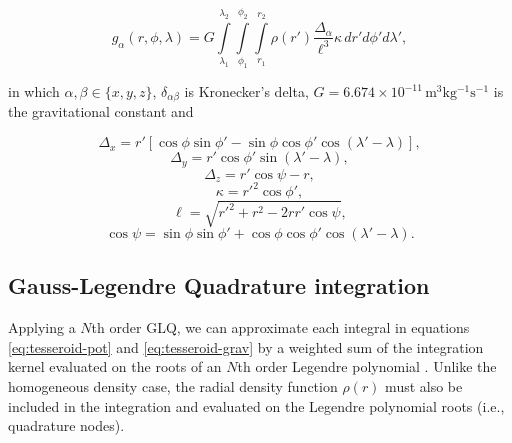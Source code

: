\documentclass[extra, referee]{gji}
\begin{document}
\begin{equation}
    g_{\alpha}(r,\phi,\lambda) = G
    \int\limits_{\lambda_1}^{\lambda_2}
    \int\limits_{\phi_1}^{\phi_2}
    \int\limits_{r_1}^{r_2}
    \rho(r') \frac{\Delta_\alpha}{\ell^3}
    \kappa \, dr' d\phi' d\lambda',
\label{eq:tesseroid-grav}
\end{equation}

\noindent in which $\alpha, \beta \in \{x, y, z\}$, $\delta_{\alpha\beta}$ is
Kronecker's delta, $G = 6.674\times10^{-11}\, \text{m$^3$kg$^{-1}$s$^{-1}$}$ is the
gravitational constant and

\begin{equation}
    \Delta_x = r'[\cos\phi\sin\phi' - \sin\phi\cos\phi'
               \cos(\lambda' - \lambda)],
\end{equation}
\begin{equation}
    \Delta_y = r' \cos \phi' \sin(\lambda' - \lambda),
\end{equation}
\begin{equation}
    \Delta_z = r' \cos \psi - r,
\end{equation}
\begin{equation}
    \kappa = {r'}^2 \cos \phi',
\end{equation}
\begin{equation}
    \ell = \sqrt{{r'}^2 + r^2 - 2 r r' \cos \psi},
\label{eq:ell}
\end{equation}
\begin{equation}
    \cos\psi = \sin\phi\sin\phi' + \cos\phi\cos\phi'
                 \cos(\lambda' - \lambda).
\label{eq:cospsi}
\end{equation}

\subsection{Gauss-Legendre Quadrature integration}

Applying a $N$th order GLQ, we can approximate each integral in equations
\ref{eq:tesseroid-pot} and \ref{eq:tesseroid-grav} by a weighted sum of the integration
kernel evaluated on the roots of an $N$th order Legendre polynomial
\citep[p.~390]{Hildebrand1987}.
Unlike the homogeneous density case, the radial density function $\rho(r)$ must also be
included in the integration and evaluated on the Legendre polynomial roots (i.e.,
quadrature nodes).
\end{document}
